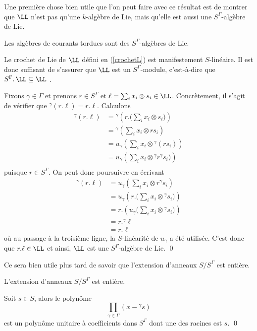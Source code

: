 Une première chose bien utile que l'on peut faire avec ce résultat est de montrer que $\LL$ n'est pas qu'une $k$-algèbre de Lie, mais qu'elle est aussi une $S^\Gamma$-algèbre de Lie.

\begin{Prop} \label{actrmod} Les algèbres de courants tordues sont des $S^\Gamma$-algèbres de Lie. 
\begin{pre} Le crochet de Lie de $\LL$ défini en (\ref{crochetL}) est manifestement $S$-linéaire. Il est donc suffisant de s'assurer que $\LL$ est un $S^\Gamma$-module, c'est-à-dire que $S^\Gamma.\,\LL \subseteq \LL$ . 

Fixons $\gamma \in \Gamma$ et prenons $r \in S^\Gamma$ et $\ell = \sum_i x_i \otimes s_i \in \LL$. Concrètement, il s'agit de vérifier que $^\gamma (r.\ell) =r.\ell$. Calculons 
\begin{align*}
^\gamma (r.\ell) &= {}^\gamma \left(r.\Big(\sum_i x_i \otimes s_i\Big)\right) \\
&= {}^\gamma \left(\sum_i x_i \otimes rs_i\right) \\
&= u_\gamma\left(\sum_i x_i \otimes {}^\gamma(rs_i)\right) \\
&= u_\gamma\left(\sum_i x_i \otimes {}^\gamma r ^\gamma s_i)\right) \\
\end{align*}
puisque $r \in S^\Gamma$. On peut donc poursuivre en écrivant
\begin{align*}
^\gamma (r.\ell) &= u_\gamma\left(\sum_i x_i \otimes r ^\gamma s_i\right) \\
&= u_\gamma\left(r.\Big(\sum_i x_i \otimes {}^\gamma s_i\Big)\right) \\
&= r.\left(u_\gamma\Big(\sum_i x_i \otimes {}^\gamma s_i\Big)\right) \\
&= r.^\gamma \ell \\
&= r.\ell
\end{align*}
où au passage à la troisième ligne, la $S$-linéarité de $u_\gamma$ a été utilisée. C'est donc que $r.\ell \in \LL$ et ainsi, $\LL$ est une $S^\Gamma$-algèbre de Lie.
\qed
\end{pre}
\end{Prop}

Ce sera bien utile plus tard de savoir que l'extension d'anneaux $S / S^\Gamma$ est entière.

\begin{Lem} \label{extensionentiere} L'extension d'anneaux $S/S^\Gamma$ est entière.
\begin{pre} Soit $s \in S$, alors le polynôme
$$ \prod_{\gamma \in \Gamma} (x- {}^\gamma s) $$
est un polynôme unitaire à coefficients dans $S^\Gamma$ dont une des racines est $s$. \qed
\end{pre}
\end{Lem}


